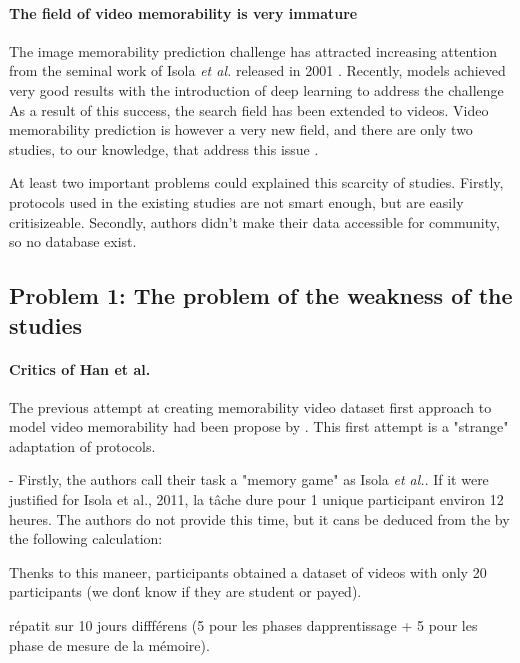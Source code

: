 \documentclass[sigconf]{acmart}
\begin{document}
\paragraph{The field of video memorability is very immature}
The image memorability prediction challenge has attracted increasing attention from the seminal work of Isola \textit{et al.} released in 2001 \cite{isola_2011_makes}.
Recently, models achieved very good results with the introduction of deep learning to address the challenge \cite{khosla_2015_understanding,baveye_2016_deep}%
As a result of this success, the search field has been extended to videos.
Video memorability prediction is however a very new field, and there are only two studies, to our knowledge, that address this issue \cite{han_2015_learning,shekhar_2017_show}.

At least two important problems could explained this scarcity of studies.
Firstly, protocols used in the existing studies are not smart enough, but are easily critisizeable.
Secondly, authors didn't make their data accessible for community, so no database exist.

\subsection{Problem 1: The problem of the weakness of the studies}

\paragraph{Critics of Han et al.}
The previous attempt at creating memorability video dataset first approach to model video memorability had been propose by \cite{han_2015_learning}. 
This first attempt is a "strange" adaptation of \cite{isola_2011_makes} protocols.

- Firstly, the authors call their task a "memory game" as Isola \textit{et al.}. If it were justified for Isola et al., 2011, la tâche dure pour 1 unique participant environ 12 heures. The authors do not provide this time, but it cans be deduced from the by the following calculation:


Thenks to this maneer, participants obtained a dataset of videos with only 20 participants (we don\'t know if they are student or payed).




répatit sur 10 jours diffférens (5 pour les phases dapprentissage + 5 pour les phase de mesure de la mémoire).
\end{document}
